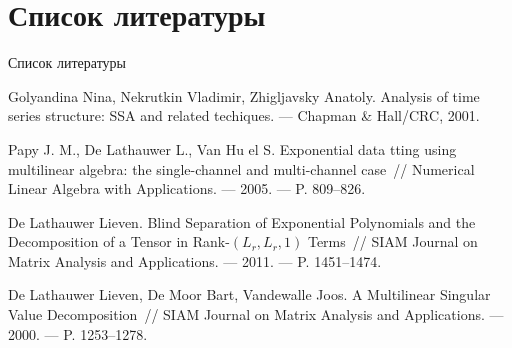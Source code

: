 \documentclass[ucs, notheorems, handout]{beamer}
\begin{document}
    \section{Список литературы}\label{sec:bib}
    \begin{frame}{Список литературы}
        \begin{thebibliography}{4}
            Golyandina Nina, Nekrutkin Vladimir, Zhigljavsky Anatoly.
            Analysis of time series structure: SSA and related techiques.
            --- Chapman \& Hall/CRC, 2001.

            Papy J. M., De Lathauwer L., Van Hu el S.
            Exponential data tting using multilinear algebra: the single-channel
            and multi-channel case~//
            Numerical Linear Algebra with Applications. --- 2005. --- P. 809--826.

            De Lathauwer Lieven.
            Blind Separation of Exponential Polynomials and the Decomposition
            of a Tensor in Rank-$(L_r, L_r, 1)$ Terms~//
            SIAM Journal on Matrix Analysis and Applications. --- 2011. --- P. 1451--1474.

            De Lathauwer Lieven, De Moor Bart, Vandewalle Joos.
            A Multilinear Singular Value Decomposition~//
            SIAM Journal on Matrix Analysis and Applications.
            --- 2000. --- P. 1253--1278.

        \end{thebibliography}

    \end{frame}
\end{document}
